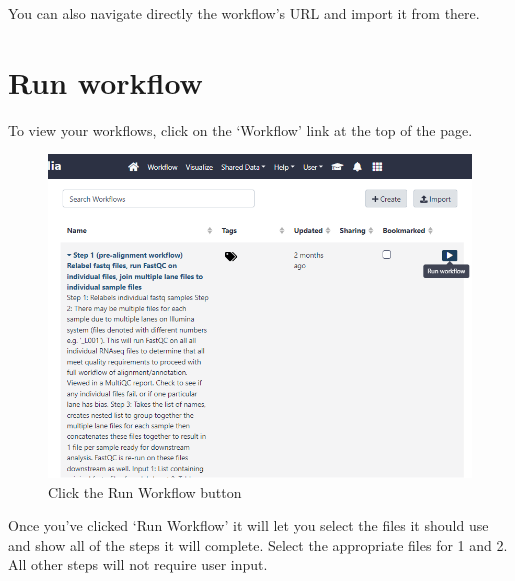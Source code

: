 \documentclass[
]{book}
\begin{document}
You can also navigate directly the workflow's URL and import it from there.

\hypertarget{run-workflow}{%
\section{Run workflow}\label{run-workflow}}

To view your workflows, click on the `Workflow' link at the top of the page.

\begin{figure}

{\centering \includegraphics[width=1\linewidth]{images/image_run_workflow} 

}

\caption{Click the Run Workflow button}\label{fig:view-workflow}
\end{figure}

Once you've clicked `Run Workflow' it will let you select the files it should use and show all of the steps it will complete.
Select the appropriate files for 1 and 2. All other steps will not require user input.
\end{document}
